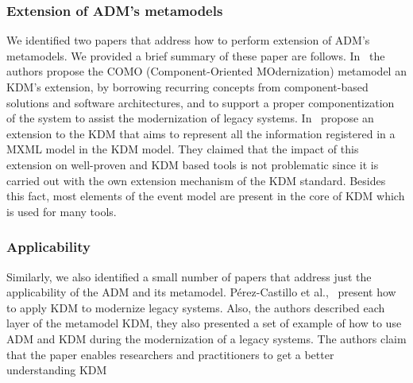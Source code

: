 \subsubsection{Extension of ADM's metamodels} %
\label{ssub:extension_of_adm_s_metamodels}

We identified two papers that address how to perform extension of ADM's metamodels. We provided a brief summary of these paper are follows. In~\cite{5773392} the authors propose the COMO (Component-Oriented MOdernization) metamodel an KDM's extension, by borrowing recurring concepts from component-based solutions and software architectures, and to support a proper componentization of the system to assist the modernization of legacy systems. In~\cite{Perez-Castillo:2012:IEL:2231936.2231949} propose an extension to the KDM that aims to represent all the information registered in a MXML model in the KDM model. They claimed that the impact of this extension on well-proven and KDM based tools is not problematic since it is carried out with the own extension mechanism of the KDM standard. Besides this fact, most elements of the event model are present in the core of KDM which is used for many tools.


\subsubsection{Applicability} %
\label{ssub:applicability}

Similarly, we also identified a small number of papers that address just the applicability of the ADM and its metamodel. P\'{e}rez-Castillo et al.,~\cite{PrezCastillo2011519} present how to apply KDM to modernize legacy systems. Also, the authors described each layer of the metamodel KDM, they also presented a set of example of how to use ADM and KDM during the modernization of a legacy systems. The authors claim that the paper enables researchers and practitioners to get a better understanding KDM









